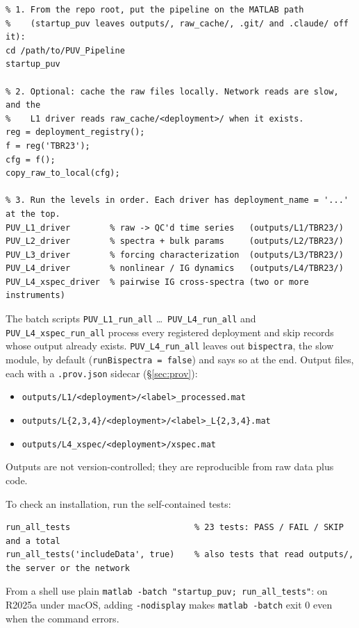 \documentclass[11pt]{article}
\newcommand{\code}[1]{\texttt{#1}}
\begin{document}
\begin{lstlisting}
% 1. From the repo root, put the pipeline on the MATLAB path
%    (startup_puv leaves outputs/, raw_cache/, .git/ and .claude/ off it):
cd /path/to/PUV_Pipeline
startup_puv

% 2. Optional: cache the raw files locally. Network reads are slow, and the
%    L1 driver reads raw_cache/<deployment>/ when it exists.
reg = deployment_registry();
f = reg('TBR23');
cfg = f();
copy_raw_to_local(cfg);

% 3. Run the levels in order. Each driver has deployment_name = '...' at the top.
PUV_L1_driver        % raw -> QC'd time series   (outputs/L1/TBR23/)
PUV_L2_driver        % spectra + bulk params     (outputs/L2/TBR23/)
PUV_L3_driver        % forcing characterization  (outputs/L3/TBR23/)
PUV_L4_driver        % nonlinear / IG dynamics   (outputs/L4/TBR23/)
PUV_L4_xspec_driver  % pairwise IG cross-spectra (two or more instruments)
\end{lstlisting}

\noindent
The batch scripts \code{PUV\_L1\_run\_all} \dots\ \code{PUV\_L4\_run\_all} and
\code{PUV\_L4\_xspec\_run\_all} process every registered deployment and skip records whose
output already exists. \code{PUV\_L4\_run\_all} leaves out \code{bispectra}, the slow module,
by default (\code{runBispectra = false}) and says so at the end. Output files, each with a \code{.prov.json} sidecar (\S\ref{sec:prov}):
\begin{itemize}
\item \code{outputs/L1/<deployment>/<label>\_processed.mat}
\item \code{outputs/L\{2,3,4\}/<deployment>/<label>\_L\{2,3,4\}.mat}
\item \code{outputs/L4\_xspec/<deployment>/xspec.mat}
\end{itemize} Outputs are not version-controlled; they are reproducible from raw data
plus code.

To check an installation, run the self-contained tests:
\begin{lstlisting}
run_all_tests                         % 23 tests: PASS / FAIL / SKIP and a total
run_all_tests('includeData', true)    % also tests that read outputs/, the server or the network
\end{lstlisting}
From a shell use plain \code{matlab -batch "startup\_puv; run\_all\_tests"}: on R2025a under
macOS, adding \code{-nodisplay} makes \code{matlab -batch} exit 0 even when the command errors.

\end{document}
